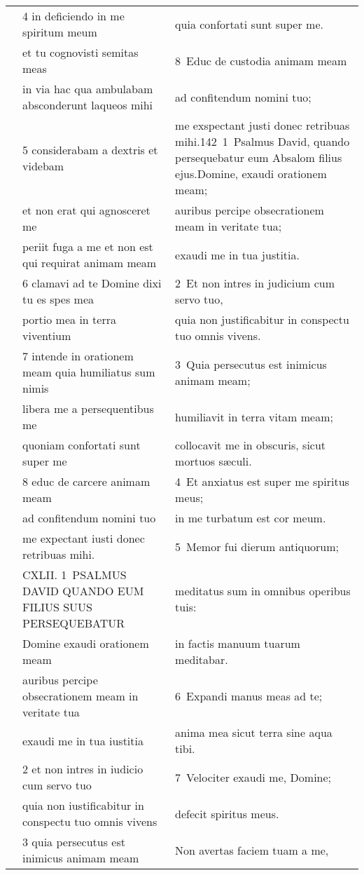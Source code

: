 \documentclass{article}
\begin{document}
\begin{longtable}{@{}p{}p{}p{}@{}}
	&	4 in deficiendo in me spiritum meum	&	quia confortati sunt super me.	\\
	&	et tu cognovisti semitas meas	&	8 Educ de custodia animam meam	\\
	&	in via hac qua ambulabam absconderunt laqueos mihi	&	ad confitendum nomini tuo;	\\
	&	5 considerabam a dextris et videbam	&	me exspectant justi donec retribuas mihi.142 1 Psalmus David, quando persequebatur eum Absalom filius ejus.Domine, exaudi orationem meam;	\\
	&	et non erat qui agnosceret me	&	auribus percipe obsecrationem meam in veritate tua;	\\
	&	periit fuga a me et non est qui requirat animam meam	&	exaudi me in tua justitia.	\\
	&	6 clamavi ad te Domine dixi tu es spes mea	&	2 Et non intres in judicium cum servo tuo,	\\
	&	portio mea in terra viventium	&	quia non justificabitur in conspectu tuo omnis vivens.	\\
	&	7 intende in orationem meam quia humiliatus sum nimis	&	3 Quia persecutus est inimicus animam meam;	\\
	&	libera me a persequentibus me	&	humiliavit in terra vitam meam;	\\
	&	quoniam confortati sunt super me	&	collocavit me in obscuris, sicut mortuos sæculi.	\\
	&	8 educ de carcere animam meam	&	4 Et anxiatus est super me spiritus meus;	\\
	&	ad confitendum nomini tuo	&	in me turbatum est cor meum.	\\
	&	me expectant iusti donec retribuas mihi.	&	5 Memor fui dierum antiquorum;	\\
	&	CXLII. 1 PSALMUS DAVID QUANDO EUM FILIUS SUUS PERSEQUEBATUR	&	meditatus sum in omnibus operibus tuis:	\\
	&	Domine exaudi orationem meam	&	in factis manuum tuarum meditabar.	\\
	&	auribus percipe obsecrationem meam in veritate tua	&	6 Expandi manus meas ad te;	\\
	&	exaudi me in tua iustitia	&	anima mea sicut terra sine aqua tibi.	\\
	&	2 et non intres in iudicio cum servo tuo	&	7 Velociter exaudi me, Domine;	\\
	&	quia non iustificabitur in conspectu tuo omnis vivens	&	defecit spiritus meus.	\\
	&	3 quia persecutus est inimicus animam meam	&	Non avertas faciem tuam a me,	\\

\end{longtable}
\end{document}
